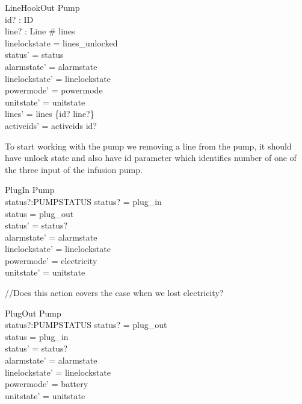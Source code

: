 \documentclass{article}
\begin{document}
	\begin{schema}{LineHookOut}
		\Delta Pump \\
		id? : ID \\
		line? : Line
		\where
		\# lines  \\
		linelockstate = lines_unlocked \\
		status' = status \\
		alarmstate' = alarmstate \\
		linelockstate' = linelockstate \\
		powermode' =  powermode \\
		unitstate' = unitstate \\
		lines' = lines \setminus \{id? \mapsto line?\} \\
		activeids' = activeids \setminus id?
	\end{schema}
	
	To start working with the pump we removing a line from the pump, it should have unlock state
	and also have id parameter which identifies number of one of the
	three input of the infusion pump.	
	
	\begin{schema}{PlugIn}
		\Delta Pump\\
		status?:PUMPSTATUS
		\where
		status? = plug\_in \\
		status = plug\_out \\
		status' = status? \\
		alarmstate' = alarmstate \\
		linelockstate' = linelockstate \\
		powermode' =  electricity \\
		unitstate' = unitstate \\
	\end{schema}
	
	//Does this action covers the case when we lost electricity?
	
	\begin{schema}{PlugOut}
		\Delta Pump\\
		status?:PUMPSTATUS
		\where
		status? = plug\_out \\
		status = plug\_in \\
		status' = status? \\
		alarmstate' = alarmstate \\
		linelockstate' = linelockstate \\
		powermode' =  battery \\
		unitstate' = unitstate \\
	\end{schema}
	
\end{document}
